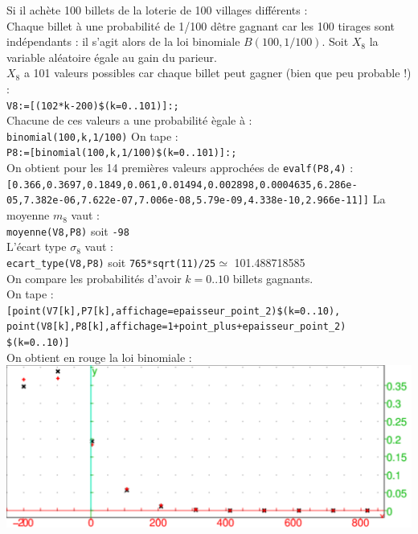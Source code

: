\documentclass[a4paper,11pt]{book}
\begin{document}
\begin{enumerate}
\begin{itemize}
Si il ach\`ete 100 billets de la loterie de 100 villages diff\'erents :\\
Chaque billet \`a une probabilit\'e de 1/100 d\^etre gagnant car les 100 tirages
sont ind\'ependants : il s'agit alors de la loi binomiale $B(100,1/100)$.
Soit $X_8$ la variable al\'eatoire \'egale au gain du parieur.\\
$X_8$ a 101 valeurs possibles car chaque billet peut gagner (bien que peu probable !) :\\
{\tt V8:=[(102*k-200)\$(k=0..101)]:;}\\
Chacune de ces valeurs a une probabilit\'e \`egale \`a  :\\
{\tt binomial(100,k,1/100)}
On tape :\\
{\tt P8:=[binomial(100,k,1/100)\$(k=0..101)]:;}\\
On obtient pour les 14 premi\`eres valeurs approch\'ees de {\tt evalf(P8,4)} :\\
{\tt [0.366,0.3697,0.1849,0.061,0.01494,0.002898,0.0004635,6.286e-05,7.382e-06,7.622e-07,7.006e-08,5.79e-09,4.338e-10,2.966e-11]]}
La moyenne $m_8$ vaut :\\
{\tt moyenne(V8,P8)} soit {\tt -98}\\
L'\'ecart type $\sigma_8$ vaut :\\
{\tt ecart\_type(V8,P8)} soit {\tt 765*sqrt(11)/25}$\simeq$ 101.488718585\\

On compare les probabilit\'es d'avoir $k=0..10$ billets gagnants.\\
On tape :\\
{\tt  [point(V7[k],P7[k],affichage=epaisseur\_point\_2)\$(k=0..10),
point(V8[k],P8[k],affichage=1+point\_plus+epaisseur\_point\_2)\\
\$(k=0..10)]}\\
On obtient en rouge la loi binomiale :\\
\includegraphics[width=\textwidth]{ecartbi}
\end{itemize}
\end{enumerate}
\end{document}
